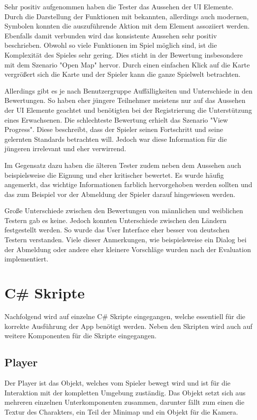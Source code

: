 				Sehr positiv aufgenommen haben die Tester das Aussehen der \ac{UI} Elemente. Durch die Darstellung der Funktionen mit bekannten, allerdings auch modernen, Symbolen konnten die auszuführende Aktion mit dem Element assoziiert werden. Ebenfalls damit verbunden wird das konsistente Aussehen sehr positiv beschrieben. Obwohl so viele Funktionen im Spiel möglich sind, ist die Komplexität des Spieles sehr gering. Dies sticht in der Bewertung insbesondere mit dem Szenario "Open Map" hervor. Durch einen einfachen Klick auf die Karte vergrößert sich die Karte und der Spieler kann die ganze Spielwelt betrachten.

				Allerdings gibt es je nach Benutzergruppe Auffälligkeiten und Unterschiede in den Bewertungen. So haben eher jüngere Teilnehmer meistens nur auf das Aussehen der \ac{UI} Elemente geachtet und benötigten bei der Registrierung die Unterstützung eines Erwachsenen. Die schlechteste Bewertung erhielt das Szenario "View Progress". Diese beschreibt, dass der Spieler seinen Fortschritt und seine gelernten Standards betrachten will. Jedoch war diese Information für die jüngeren irrelevant und eher verwirrend.

				Im Gegensatz dazu haben die älteren Tester zudem neben dem Aussehen auch beispielsweise die Eignung und eher kritischer bewertet. Es wurde häufig angemerkt, das wichtige Informationen farblich hervorgehoben werden sollten und das zum Beispiel vor der Abmeldung der Spieler darauf hingewiesen werden.

				Große Unterschiede zwischen den Bewertungen von männlichen und weiblichen Testern gab es keine. Jedoch konnten Unterschiede zwischen den Ländern festgestellt werden. So wurde das User Interface eher besser von deutschen Testern verstanden. Viele dieser Anmerkungen, wie beispielsweise ein Dialog bei der Abmeldung oder andere eher kleinere Vorschläge wurden nach der Evaluation implementiert.

	\section{C\# Skripte}
		Nachfolgend wird auf einzelne C\# Skripte eingegangen, welche essentiell für die korrekte Ausführung der App benötigt werden. Neben den Skripten wird auch auf weitere Komponenten für die Skripte eingegangen.

		\subsection{Player}
			Der Player ist das Objekt, welches vom Spieler bewegt wird und ist für die Interaktion mit der kompletten Umgebung zuständig. Das Objekt setzt sich aus mehreren einzelnen Unterkomponenten zusammen, darunter fällt zum einen die Textur des Charakters, ein Teil der Minimap und ein Objekt für die Kamera. 
	
